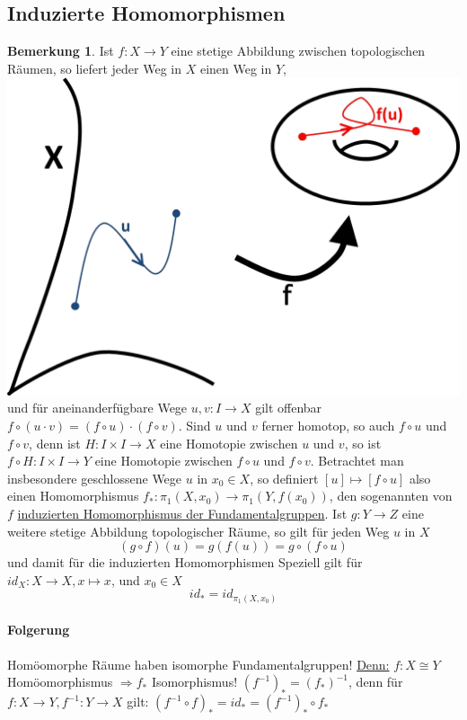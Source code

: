 \documentclass[a4paper,11pt,notitlepage]{report}
\theoremstyle{definition}
\newtheorem{remark}{Bemerkung}[chapter]
\begin{document}
\subsection{Induzierte Homomorphismen}
\begin{remark}
	Ist $f \colon X \rightarrow Y$ eine stetige Abbildung zwischen topologischen Räumen, so liefert jeder Weg in $X$ einen Weg in $Y$, \includegraphics[scale=0.4]{images/Weg_stetige_Abbildung.png} und für aneinanderfügbare Wege $u,v \colon I \rightarrow X$ gilt offenbar $f \circ (u \cdot v) = (f \circ u) \cdot (f \circ v)$.
	\newline
	Sind $u$ und $v$ ferner homotop, so auch $f \circ u$ und $f \circ v$, denn ist $H \colon I \times I \rightarrow X$ eine Homotopie zwischen $u$ und $v$, so ist $f \circ H \colon I \times I \rightarrow Y$ eine Homotopie zwischen $f \circ u$ und $f \circ v$.
	\newline
	Betrachtet man insbesondere geschlossene Wege $u$ in $x_0 \in X$, so definiert $[u] \mapsto [f \circ u]$ also einen Homomorphismus $f_* \colon \pi_1(X,x_0) \rightarrow \pi_1(Y, f(x_0))$, den sogenannten von $f$ \underline{induzierten Homomorphismus der Fundamentalgruppen}.
	\newline
	Ist $g \colon Y \rightarrow Z$ eine weitere stetige Abbildung topologischer Räume, so gilt für jeden Weg $u$ in $X$
	$$(g \circ f) (u) = g(f(u)) = g \circ (f \circ u)$$
	und damit für die induzierten Homomorphismen 
	 \newline
	Speziell gilt für $id_X \colon X \rightarrow X, x \mapsto x$, und $x_0 \in X$
	$$id_* = id_{\pi_1(X,x_0)}$$
	
	\paragraph{Folgerung} Homöomorphe Räume haben isomorphe Fundamentalgruppen!
	\underline{Denn:} $f \colon X \cong Y$ Homöomorphismus $\Rightarrow f_*$ Isomorphismus!
	\newline
	$(f^{-1})_*=(f_*)^{-1}$, denn für
	$f \colon X \rightarrow Y, f^{-1} \colon Y \rightarrow X$ gilt:\newline
	$(f^{-1} \circ f)_* = id_* = (f^{-1})_* \circ f_*$
\end{remark}
\end{document}
